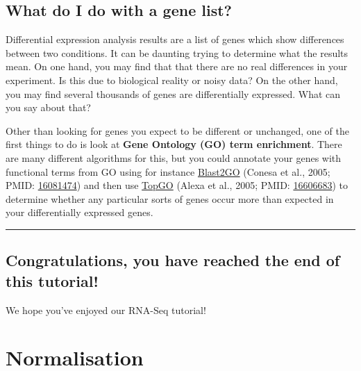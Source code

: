\documentclass[11pt]{article}
\begin{document}
\hypertarget{what-do-i-do-with-a-gene-list}{%
\subsection{What do I do with a gene
list?}\label{what-do-i-do-with-a-gene-list}}

Differential expression analysis results are a list of genes which show
differences between two conditions. It can be daunting trying to
determine what the results mean. On one hand, you may find that that
there are no real differences in your experiment. Is this due to
biological reality or noisy data? On the other hand, you may find
several thousands of genes are differentially expressed. What can you
say about that?

Other than looking for genes you expect to be different or unchanged,
one of the first things to do is look at \textbf{Gene Ontology (GO) term
enrichment}. There are many different algorithms for this, but you could
annotate your genes with functional terms from GO using for instance
\url{Blast2GO} (Conesa et al., 2005; PMID:
\href{https://www.ncbi.nlm.nih.gov/pubmed/16081474}{16081474}) and then
use
\href{https://bioconductor.org/packages/release/bioc/html/topGO.html}{TopGO}
(Alexa et al., 2005; PMID:
\href{https://www.ncbi.nlm.nih.gov/pubmed/16606683}{16606683}) to
determine whether any particular sorts of genes occur more than expected
in your differentially expressed genes.

    \begin{center}\rule{0.5\linewidth}{.4pt}\end{center}

    \hypertarget{congratulations-you-have-reached-the-end-of-this-tutorial}{%
\subsection{Congratulations, you have reached the end of this
tutorial!}\label{congratulations-you-have-reached-the-end-of-this-tutorial}}

We hope you've enjoyed our RNA-Seq tutorial!





\newpage





    \hypertarget{normalisation}{%
\section{Normalisation}\label{normalisation}}
\end{document}
